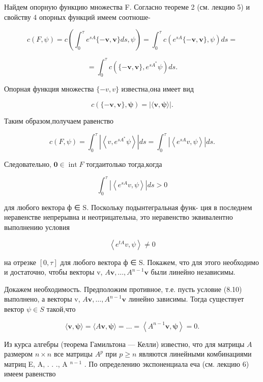 \documentclass[8pt]{extarticle}
\begin{document}
Найдем опорную функцию множества F. Согласно теореме 2 (см. лекцию 5) и свойству 4 опорных функций имеем соотноше-

\[
c\left( {F,\psi }\right)  = c\left( {{\int }_{0}^{\tau }{e}^{sA}\{  - \mathbf{v},\mathbf{v}\} {ds},\psi }\right)  = {\int }_{0}^{\tau }c\left( {{e}^{sA}\{  - \mathbf{v},\mathbf{v}\} ,\psi }\right) {ds} =
\]

\[
= {\int }_{0}^{\tau }c\left( {\{  - \mathbf{v},\mathbf{v}\} ,{e}^{s{A}^{ * }}\psi }\right) {ds}.
\]

Опорная функция множества \(\{  - v,v\}\) известна,она имеет вид

\[
c\left( {\{  - \mathbf{v},\mathbf{v}\} ,\mathbf{\psi }}\right)  = \left| {\langle \mathbf{v},\mathbf{\psi }\rangle }\right| .
\]

Таким образом,получаем равенство

\[
c\left( {F,\psi }\right)  = {\int }_{0}^{\tau }\left| \left\langle  {v,{e}^{s{A}^{ * }}\psi }\right\rangle  \right| {ds} = {\int }_{0}^{\tau }\left| \left\langle  {{e}^{sA}v,\psi }\right\rangle  \right| {ds}.
\]

Следовательно, \(\mathbf{0} \in  \operatorname{int}F\) тогдаитолько тогда,когда

\[
{\int }_{0}^{\tau }\left| \left\langle  {{e}^{sA}v,\psi }\right\rangle  \right| {ds} > 0
\]

для любого вектора ф ∈ S. Поскольку подынтегральная функ- ция в последнем неравенстве непрерывна и неотрицательна, это неравенство эквивалентно выполнению условия

\[
\left\langle  {{e}^{tA}v,\psi }\right\rangle   \neq  0 \tag{8.10}
\]

на отрезке \(\left\lbrack  {0,\tau }\right\rbrack\) для любого вектора ф ∈ S. Покажем, что для этого необходимо и достаточно, чтобы векторы v, \(A\mathbf{v},\ldots ,{A}^{n - 1}\mathbf{v}\) были линейно независимы.

Докажем необходимость. Предположим противное, т.е. пусть условие (8.10) выполнено, а векторы v, \(A\mathbf{v},\ldots ,{A}^{n - 1}\mathbf{v}\) линейно зависимы. Тогда существует вектор \(\psi  \in  S\) такой,что

\[
\langle \mathbf{v},\mathbf{\psi }\rangle  = \langle A\mathbf{v},\mathbf{\psi }\rangle  = \ldots  = \left\langle  {{A}^{n - 1}\mathbf{v},\mathbf{\psi }}\right\rangle   = 0. \tag{8.11}
\]

Из курса алгебры (теорема Гамильтона — Келли) известно, что для матрицы \(A\) размером \(n \times  n\) все матрицы \({A}^{p}\) при \(p \geq  n\) являются линейными комбинациями матриц E, A, . . ., A \({}^{n - 1}\) . По определению экспоненциала еча (см. лекцию 6) имеем равенство
\end{document}

